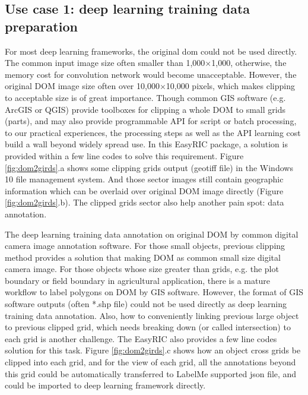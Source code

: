 \documentclass{configs/bmcart}
\begin{document}
\subsection*{Use case 1: deep learning training data preparation}
For most deep learning frameworks, the original \acrfull*{dom} could not be used directly. The common input image size often smaller than 1,000$\times$1,000, otherwise, the memory cost for convolution network would become unacceptable. However, the original DOM image size often over 10,000$\times$10,000 pixels, which makes clipping to acceptable size is of great importance. Though common GIS software (e.g. ArcGIS or QGIS) provide toolboxes for clipping a whole DOM to small grids (parts), and may also provide programmable API for script or batch processing, to our practical experiences, the processing steps as well as the API learning cost build a wall beyond widely spread use. In this EasyRIC package, a solution is provided within a few line codes to solve this requirement. Figure \ref{fig:dom2girds}.a shows some clipping grids output (geotiff file) in the Windows 10 file management system. And those sector images still contain geographic information which can be overlaid over original DOM image directly (Figure \ref{fig:dom2girds}.b). The clipped grids sector also help another pain spot: data annotation.

The deep learning training data annotation on original DOM by common digital camera image annotation software. For those small objects, previous clipping method provides a solution that making DOM as common small size digital camera image. For those objects whose size greater than grids, e.g. the plot boundary or field boundary in agricultural application, there is a mature workflow to label polygons on DOM by GIS software. However, the format of GIS software outputs (often *.shp file) could not be used directly as deep learning training data annotation. Also, how to conveniently linking previous large object to previous clipped grid, which needs breaking down (or called intersection) to each grid is another challenge. The EasyRIC also provides a few line codes solution for this task. Figure \ref{fig:dom2girds}.c shows how an object cross grids be clipped into each grid, and for the view of each grid, all the annotations beyond this grid could be automatically transferred to LabelMe supported json file, and could be imported to deep learning framework directly.
\end{document}
